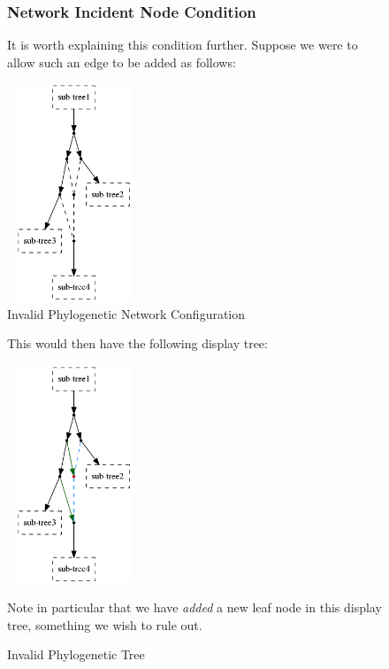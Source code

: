 \documentclass[11pt]{article}
\begin{document}
\begin{figure}
\subsubsection{Network Incident Node Condition}
It is worth explaining this condition further. 
Suppose we were to allow such an edge to be added as follows:

  \begin{center}
  \includegraphics[width=40mm, height=65mm]{disallowed-display-network1.png}
  \caption{Invalid Phylogenetic Network Configuration}
  \label{fig:disallowed-display-network1}
  \end{center}
\end{figure}


\begin{figure}
This would then have the following display tree:
  \begin{center}
  \includegraphics[width=40mm, height=65mm]{disallowed-display-tree1.png}
  \caption{Invalid Phylogenetic Tree}
  \label{fig:disallowed-display-tree1.png}
  \end{center}

Note in particular that we have \textit{added} a new leaf node in this display tree, something we wish to rule out.
\end{figure}

\newpage
\singlespacing

%


%
\end{document}
